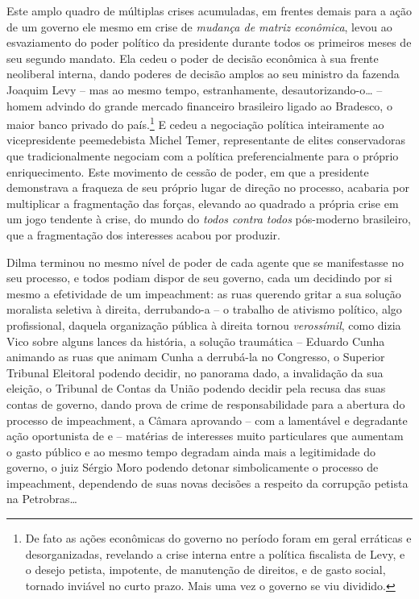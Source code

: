 Este amplo quadro de múltiplas crises acumuladas, em frentes demais para
a ação de um governo ele mesmo em crise de \emph{mudança de matriz
econômica}, levou ao esvaziamento do poder político da presidente
durante todos os primeiros meses de seu segundo mandato. Ela cedeu o
poder de decisão econômica à sua frente neoliberal interna, dando
poderes de decisão amplos ao seu ministro da fazenda Joaquim Levy -- mas
ao mesmo tempo, estranhamente, desautorizando-o… -- homem advindo do
grande mercado financeiro brasileiro ligado ao Bradesco, o maior banco
privado do país.\footnote{De fato as ações econômicas do governo no
  período foram em geral erráticas e desorganizadas, revelando a crise
  interna entre a política fiscalista de Levy, e o desejo petista,
  impotente, de manutenção de direitos, e de gasto social, tornado
  inviável no curto prazo. Mais uma vez o governo se viu dividido.} E
cedeu a negociação política inteiramente ao vicepresidente peemedebista
Michel Temer, representante de elites conservadoras que tradicionalmente
negociam com a política preferencialmente para o próprio enriquecimento.
Este movimento de cessão de poder, em que a presidente demonstrava a
fraqueza de seu próprio lugar de direção no processo, acabaria por
multiplicar a fragmentação das forças, elevando ao quadrado a própria
crise em um jogo tendente à crise, do mundo do \emph{todos contra todos}
pós-moderno brasileiro, que a fragmentação dos interesses acabou por
produzir.

Dilma terminou no mesmo nível de poder de cada agente que se
manifestasse no seu processo, e todos podiam dispor de seu governo, cada
um decidindo por si mesmo a efetividade de um impeachment: as ruas
querendo gritar a sua solução moralista seletiva à direita, derrubando-a
– o trabalho de ativismo político, algo profissional, daquela organização
pública à direita tornou \emph{verossímil}, como dizia Vico 
sobre alguns lances da história, a solução traumática – Eduardo Cunha animando as ruas que animam Cunha a
derrubá-la no Congresso, o Superior Tribunal Eleitoral podendo decidir,
no panorama dado, a invalidação da sua eleição, o Tribunal de Contas da
União podendo decidir pela recusa das suas contas de governo, dando
prova de crime de responsabilidade para a abertura do processo de
impeachment, a Câmara aprovando -- com a lamentável e degradante ação
oportunista de  e  -- matérias de interesses muito particulares
que aumentam o gasto público e ao mesmo tempo degradam ainda mais a
legitimidade do governo, o juiz Sérgio Moro podendo detonar
simbolicamente o processo de impeachment, dependendo de suas novas
decisões a respeito da corrupção petista na Petrobras…

